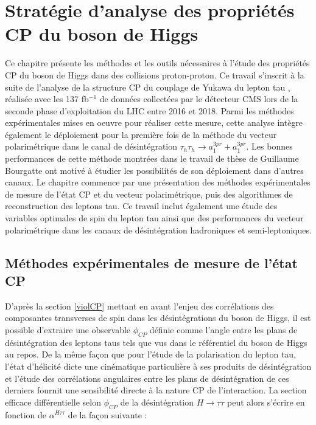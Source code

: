 \chapter{Stratégie d'analyse des propriétés CP du boson de Higgs}
\label{chap6}

Ce chapitre présente les méthodes et les outils nécessaires à l'étude des propriétés CP du boson de Higgs dans des collisions proton-proton. Ce travail s'inscrit à la suite de l'analyse de la structure CP du couplage de Yukawa du lepton tau \cite{Htautau}, réalisée avec les 137 fb$^{-1}$ de données collectées par le détecteur CMS lors de la seconde phase d'exploitation du LHC entre 2016 et 2018. Parmi les méthodes expérimentales mises en oeuvre pour réaliser cette mesure, cette analyse intègre également le déploiement pour la première fois de la méthode du vecteur polarimétrique dans le canal de désintégration $\tau_h\tau_h\rightarrow a_1^{3pr}+a_1^{3pr}$. Les bonnes performances de cette méthode montrées dans le travail de thèse de Guillaume Bourgatte \cite{guigui} ont motivé à étudier les possibilités de son déploiement dans d'autres canaux. Le chapitre commence par une présentation des méthodes expérimentales de mesure de l'état CP et du vecteur polarimétrique, puis des algorithmes de reconstruction des leptons tau. Ce travail inclut également une étude des variables optimales de spin du lepton tau ainsi que des performances du vecteur polarimétrique dans les canaux de désintégration hadroniques et semi-leptoniques.

\section{Méthodes expérimentales de mesure de l'état CP}
\label{CPmethods}

D'après la section \ref{violCP} mettant en avant l'enjeu des corrélations des composantes transverses de spin dans les désintégrations du boson de Higgs, il est possible d'extraire une observable $\phi_{CP}$ définie comme l'angle entre les plans de désintégration des leptons taus tels que vus dans le référentiel du boson de Higgs au repos. De la même façon que pour l'étude de la polarisation du lepton tau, l'état d'hélicité dicte une cinématique particulière à ses produits de désintégration et l'étude des corrélations angulaires entre les plans de désintégration de ces derniers fournit une sensibilité directe à la nature CP de l'interaction. La section efficace différentielle selon $\phi_{CP}$ de la désintégration $H\rightarrow \tau\tau$ peut alors s'écrire en fonction de $\alpha^{H\tau\tau}$ de la façon suivante :

